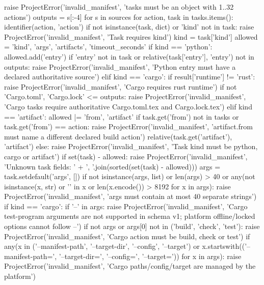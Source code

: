         raise ProjectError('invalid_manifest', 'tasks must be an object with 1..32 actions')
    outputs = {s[:-4] for s in sources}
    for action, task in tasks.items():
        identifier(action, 'action')
        if not isinstance(task, dict) or 'kind' not in task:
            raise ProjectError('invalid_manifest', 'Task requires kind')
        kind = task['kind']
        allowed = {'kind', 'args', 'artifacts', 'timeout_seconds'}
        if kind == 'python':
            allowed.add('entry')
            if 'entry' not in task or relative(task['entry'], 'entry') not in outputs:
                raise ProjectError('invalid_manifest', 'Python entry must have a declared authoritative source')
        elif kind == 'cargo':
            if result['runtime'] != 'rust':
                raise ProjectError('invalid_manifest', 'Cargo requires rust runtime')
            if not {'Cargo.toml', 'Cargo.lock'} <= outputs:
                raise ProjectError('invalid_manifest', 'Cargo tasks require authoritative Cargo.toml.tex and Cargo.lock.tex')
        elif kind == 'artifact':
            allowed |= {'from', 'artifact'}
            if task.get('from') not in tasks or task.get('from') == action:
                raise ProjectError('invalid_manifest', 'artifact.from must name a different declared build action')
            relative(task.get('artifact'), 'artifact')
        else:
            raise ProjectError('invalid_manifest', 'Task kind must be python, cargo or artifact')
        if set(task) - allowed:
            raise ProjectError('invalid_manifest', 'Unknown task fields: ' + ', '.join(sorted(set(task) - allowed)))
        args = task.setdefault('args', [])
        if not isinstance(args, list) or len(args) > 40 or any(not isinstance(x, str) or '\0' in x or len(x.encode()) > 8192 for x in args):
            raise ProjectError('invalid_manifest', 'args must contain at most 40 separate strings')
        if kind == 'cargo':
            if '--' in args:
                raise ProjectError('invalid_manifest', 'Cargo test-program arguments are not supported in schema v1; platform offline/locked options cannot follow --')
            if not args or args[0] not in ('build', 'check', 'test'):
                raise ProjectError('invalid_manifest', 'Cargo action must be build, check or test')
            if any(x in ('--manifest-path', '--target-dir', '--config', '--target') or x.startswith(('--manifest-path=', '--target-dir=', '--config=', '--target=')) for x in args):
                raise ProjectError('invalid_manifest', 'Cargo paths/config/target are managed by the platform')
